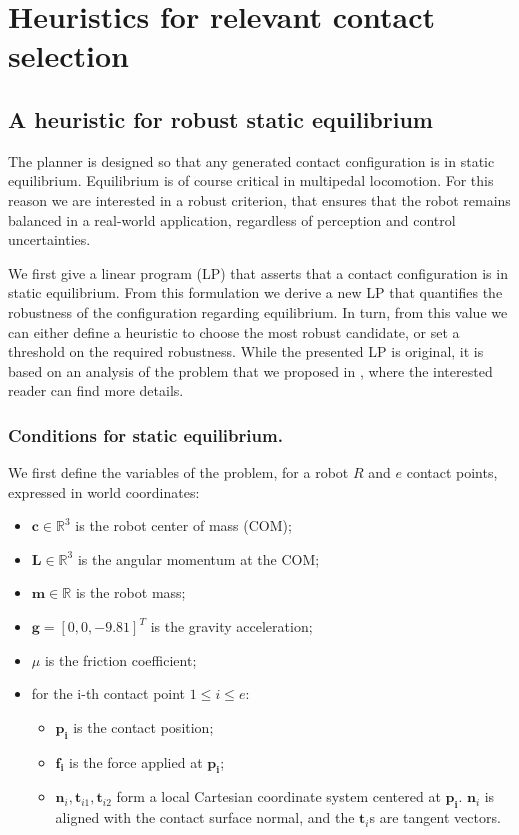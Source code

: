 \section{Heuristics for relevant contact selection}
\label{sec:heuristics}
\subsection{A heuristic for robust static equilibrium}
The planner is designed so that any generated contact configuration is in static equilibrium.
Equilibrium is of course critical in multipedal locomotion. For this reason we are interested in a robust 
criterion, that ensures that the robot remains balanced in a real-world application, regardless of perception and control uncertainties.

We first give a linear program (LP) that asserts that a contact configuration is in static equilibrium.
From this formulation we derive a new LP that quantifies the robustness of the configuration regarding equilibrium.
In turn, from this value we can either define a heuristic to choose the most robust candidate, or set a threshold on the required robustness. While the presented LP is original, it is based on an analysis of the problem that we proposed in \citep{Prete2016}, where the interested reader can find more details.


\subsubsection{Conditions for static equilibrium.}
We first define the variables of the problem, for a robot $R$ and $e$ contact points, expressed in world coordinates:
\begin{itemize}
\item $\mathbf{c} \in \mathbb{R}^3$ is the robot center of mass (COM);
\item $\mathbf{L}  \in \mathbb{R}^3 $ is the angular momentum at the COM;
\item $\mathbf{m} \in \mathbb{R}$ is the robot mass;
\item $\mathbf{g} = [0,0,-9.81]^T$ is the gravity acceleration;
\item $\mu$ is the friction coefficient;
\item for the i-th contact point $1 \leq i \leq e$:
	\begin{itemize}
	\item $\mathbf{p_i}$ is the contact position;
	\item $\mathbf{f_i}$ is the force applied at $\mathbf{p_i}$;
	\item $\mathbf{n}_i,\mathbf{t}_{i1},\mathbf{t}_{i2}$ form a local Cartesian coordinate system centered at $\mathbf{p_i}$. $\mathbf{n}_i$ is aligned
	with the contact surface normal, and the $\mathbf{t}_i$s are tangent vectors.
	\end{itemize}
\end{itemize}

